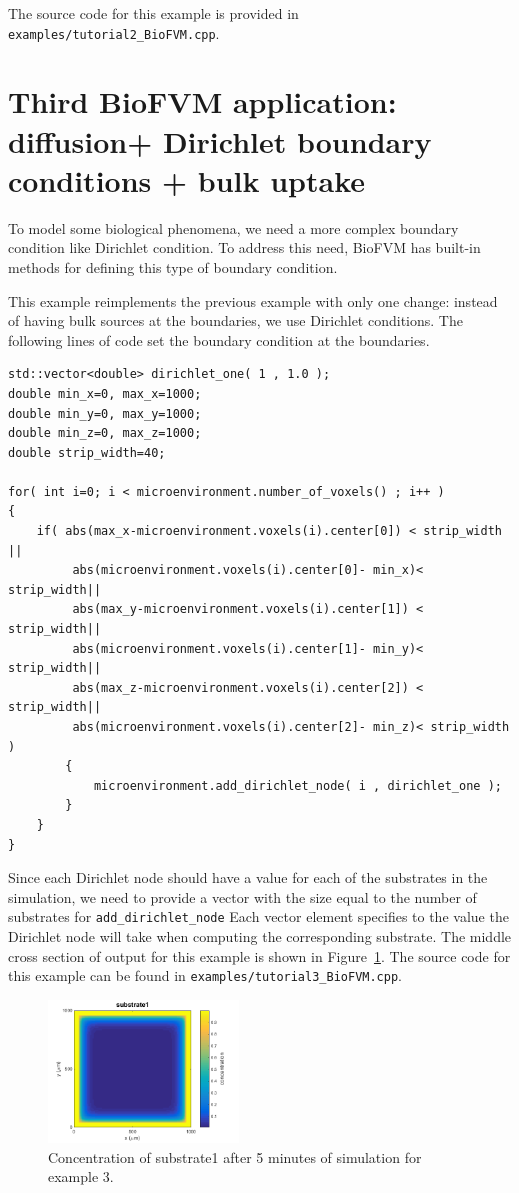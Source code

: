 \documentclass[11pt]{article}
\begin{document}
The source code for this example is provided in \verb:examples/tutorial2_BioFVM.cpp:.

\section{Third BioFVM application: diffusion+ Dirichlet boundary conditions + bulk uptake}
\label{third_example}
To model some biological phenomena, we need a more complex boundary condition like Dirichlet condition. To address this need, BioFVM has built-in methods for
defining this type of boundary condition.

This example reimplements the previous example with only one change: instead of having bulk sources at the boundaries, we use Dirichlet conditions. The following
lines of code set the boundary condition at the boundaries.

\begin{verbatim}
std::vector<double> dirichlet_one( 1 , 1.0 );
double min_x=0, max_x=1000;
double min_y=0, max_y=1000;
double min_z=0, max_z=1000;
double strip_width=40;	

for( int i=0; i < microenvironment.number_of_voxels() ; i++ )
{
    if( abs(max_x-microenvironment.voxels(i).center[0]) < strip_width ||
         abs(microenvironment.voxels(i).center[0]- min_x)< strip_width||
         abs(max_y-microenvironment.voxels(i).center[1]) < strip_width||
         abs(microenvironment.voxels(i).center[1]- min_y)< strip_width||
         abs(max_z-microenvironment.voxels(i).center[2]) < strip_width||
         abs(microenvironment.voxels(i).center[2]- min_z)< strip_width )
        {
            microenvironment.add_dirichlet_node( i , dirichlet_one );
        }		
    }
}
\end{verbatim}

Since each Dirichlet node should have a value for each of the substrates in the simulation, we need to provide a vector with the size equal to the number of substrates for
\verb:add_dirichlet_node: Each vector element specifies to the value the Dirichlet node will take when computing the corresponding substrate. The middle cross section of output for this example is shown in Figure~\ref{./figures/tutorial3_fig1}. The source code for this example can be found in \verb:examples/tutorial3_BioFVM.cpp:.

\begin{figure}[h]
\centering
\includegraphics[width=0.45\textwidth]{./figures/tutorial3_fig1.png}
\caption{Concentration of substrate1 after 5 minutes of simulation for example 3.}
\label{./figures/tutorial3_fig1}
\end{figure}
\end{document}
